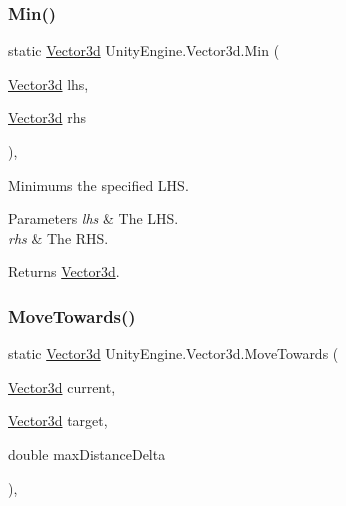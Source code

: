 \subsubsection{\texorpdfstring{Min()}{Min()}}
{\footnotesize\ttfamily static \hyperlink{struct_unity_engine_1_1_vector3d}{Vector3d} Unity\+Engine.\+Vector3d.\+Min (\begin{DoxyParamCaption}\item[{\hyperlink{struct_unity_engine_1_1_vector3d}{Vector3d}}]{lhs,  }\item[{\hyperlink{struct_unity_engine_1_1_vector3d}{Vector3d}}]{rhs }\end{DoxyParamCaption})\hspace{0.3cm}{\ttfamily [inline]}, {\ttfamily [static]}}



Minimums the specified L\+HS. 


\begin{DoxyParams}{Parameters}
{\em lhs} & The L\+HS.\\
\hline
{\em rhs} & The R\+HS.\\
\hline
\end{DoxyParams}
\begin{DoxyReturn}{Returns}
\hyperlink{struct_unity_engine_1_1_vector3d}{Vector3d}.
\end{DoxyReturn}
\mbox{\label{struct_unity_engine_1_1_vector3d_a725d6c801b1eb7d7395ede7b630d994d}} 
\subsubsection{\texorpdfstring{Move\+Towards()}{MoveTowards()}}
{\footnotesize\ttfamily static \hyperlink{struct_unity_engine_1_1_vector3d}{Vector3d} Unity\+Engine.\+Vector3d.\+Move\+Towards (\begin{DoxyParamCaption}\item[{\hyperlink{struct_unity_engine_1_1_vector3d}{Vector3d}}]{current,  }\item[{\hyperlink{struct_unity_engine_1_1_vector3d}{Vector3d}}]{target,  }\item[{double}]{max\+Distance\+Delta }\end{DoxyParamCaption})\hspace{0.3cm}{\ttfamily [inline]}, {\ttfamily [static]}}



